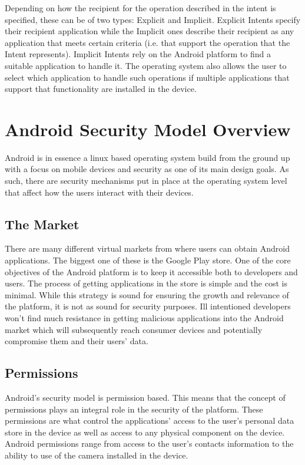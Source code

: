 \documentclass[conference]{IEEEtran}
\begin{document}
Depending on how the recipient for the operation described in the intent is specified, these can be of two types: Explicit and Implicit. Explicit Intents specify their recipient application while the Implicit ones describe their recipient as any application that meets certain criteria (i.e. that support the operation that the Intent represents). Implicit Intents rely on the Android platform to find a suitable application to handle it. The operating system also allows the user to select which application to handle such operations if multiple applications that support that functionality are installed in the device.

\section{Android Security Model Overview}

Android is in essence a linux based operating system build from the ground up with a focus on mobile devices and security as one of its main design goals. As such, there are security mechanisms put in place at the operating system level that affect how the users interact with their devices.

\subsection{The Market}

There are many different virtual markets from where users can obtain Android applications. The biggest one of these is the Google Play store. One of the core objectives of the Android platform is to keep it accessible both to developers and users. The process of getting applications in the store is simple and the cost is minimal. While this strategy is sound for ensuring the growth and relevance of the platform, it is not as sound for security purposes. Ill intentioned developers won't find much resistance in getting malicious applications into the Android market which will subsequently reach consumer devices and potentially compromise them and their users' data.

\subsection{Permissions}

Android's security model is permission based. This means that the concept of permissions plays an integral role in the security of the platform. These permissions are what control the applications' access to the user's personal data store in the device as well as access to any physical component on the device. Android permissions range from access to the user's contacts information to the ability to use of the camera installed in the device.
\end{document}
